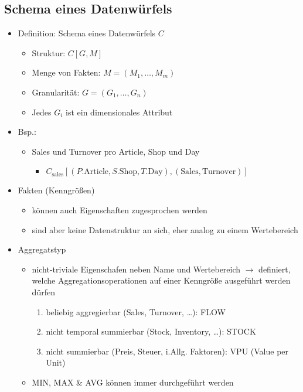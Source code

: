 \subsection{Schema eines Datenwürfels}
\begin{itemize}
	\item Definition: Schema eines Datenwürfels $C$
		\begin{itemize}
			\item Struktur: $C[G,M]$
			\item Menge von Fakten: $M = (M_1,\dots , M_m)$
			\item Granularität: $G = (G_1,\dots , G_n)$
			\item Jedes $G_i$ ist ein dimensionales Attribut 
		\end{itemize}
	\item Bsp.:
		\begin{itemize}
			\item Sales und Turnover pro Article, Shop und Day
				\begin{itemize}
					\item $C_\text{sales}[(P.\text{Article}, S.\text{Shop}, T.\text{Day}), (\text{Sales}, \text{Turnover})]$
				\end{itemize}
		\end{itemize}
	\item Fakten (Kenngrößen)
		\begin{itemize}
			\item können auch Eigenschaften zugesprochen werden
			\item sind aber keine Datenstruktur an sich, eher analog zu einem Wertebereich
		\end{itemize}
	\item Aggregatstyp
		\begin{itemize}
			\item nicht-triviale Eigenschafen neben Name und Wertebereich $\rightarrow$ definiert, welche Aggregationsoperationen auf einer Kenngröße ausgeführt werden dürfen
				\begin{enumerate}
					  \item beliebig aggregierbar (Sales, Turnover, \dots): FLOW
					  \item nicht temporal summierbar (Stock, Inventory, \dots): STOCK
					  \item nicht summierbar (Preis, Steuer, i.Allg. Faktoren): VPU (Value per Unit)
				\end{enumerate}
			\item MIN, MAX \& AVG können immer durchgeführt werden
		\end{itemize}
\end{itemize}
